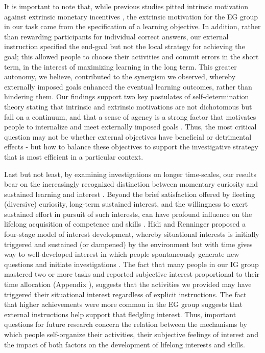 It is important to note that, while previous studies pitted intrinsic motivation against extrinsic monetary incentives \parencite[e.g.,][]{murayama2019motivated}, the extrinsic motivation for the \ac{EG} group in our task came from the specification of a learning objective. In addition, rather than rewarding participants for individual correct answers, our external instruction specified the end-goal but not the local strategy for achieving the goal; this allowed people to choose their activities and commit errors in the short term, in the interest of maximizing learning in the long term. This greater autonomy, we believe, contributed to the synergism we observed, whereby externally imposed goals enhanced the eventual learning outcomes, rather than hindering them. Our findings support two key postulates of self-determination theory stating that intrinsic and extrinsic motivations are not dichotomous but fall on a continuum, and that a sense of agency is a strong factor that motivates people to internalize and meet externally imposed goals \parencite{ryan_intrinsic_2020}. Thus, the most critical question may not be whether external objectives have beneficial or detrimental effects - but how to balance these objectives to support the investigative strategy that is most efficient in a particular context.

Last but not least, by examining investigations on longer time-scales, our results bear on the increasingly recognized distinction between momentary curiosity and sustained learning and interest \parencite{hidi_interest_2019,murayama_process_2019}. Beyond the brief satisfaction offered by fleeting (diversive) curiosity, long-term sustained interest, and the willingness to exert sustained effort in pursuit of such interests, can have profound influence on the lifelong acquisition of competence and skills \parencite{hidi_interest_2019,hidi_four-phase_2006}. Hidi and Renninger \citeyearpar{hidi_interest_2019,hidi_four-phase_2006} proposed a four-stage model of interest development, whereby situational interests is initially triggered and sustained (or dampened) by the environment but with time gives way to well-developed interest in which people spontaneously generate new questions and initiate investigations \parencite{son_metacognitive_2000}. The fact that many people in our \ac{IG} group mastered two or more tasks and reported subjective interest proportional to their time allocation (Appendix ), suggests that the activities we provided may have triggered their situational interest regardless of explicit instructions. The fact that higher achievements were more common in the \ac{EG} group suggests that external instructions help support that fledgling interest. Thus, important questions for future research concern the relation between the mechanisms by which people self-organize their activities, their subjective feelings of interest and the impact of both factors on the development of lifelong interests and skills.

